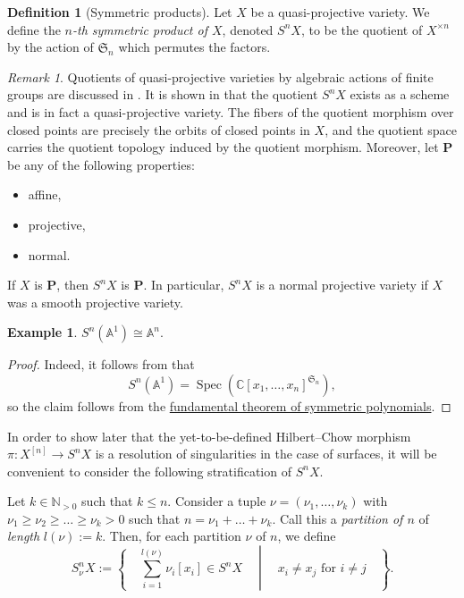 \documentclass[12pt,a4paper]{amsart}
\theoremstyle{plain}
\theoremstyle{definition}
\newtheorem{defn}[thm]{Definition}
\newtheorem{exmp}[thm]{Example}
\theoremstyle{remark}
\newtheorem{rem}[thm]{Remark}
\begin{document}
\begin{defn}[Symmetric products]
  Let $X$ be a quasi-projective variety.
  We define the \textit{$n$-th symmetric product of $X$}, denoted $S^{n}X$, to be the quotient of $X^{\times n}$ by the action of $\mathfrak{S}_{n}$ which permutes the factors.
\end{defn}

\begin{rem}
  Quotients of quasi-projective varieties by algebraic actions of finite groups are discussed in .
  It is shown in  that the quotient $S^{n}X$ exists as a scheme and is in fact a quasi-projective variety.
  The fibers of the quotient morphism over closed points are precisely the orbits of closed points in $X$, and the quotient space carries the quotient topology induced by the quotient morphism.
  Moreover, let $\mathbf{P}$ be any of the following properties:
  \begin{itemize}
    \item affine,
    \item projective,
    \item normal.
  \end{itemize}
  If $X$ is $\mathbf{P}$, then $S^{n}X$ is $\mathbf{P}$.
  In particular, $S^{n}X$ is a normal projective variety if $X$ was a smooth projective variety.
\end{rem}

\begin{exmp}\label{exmp:affineline}
  $S^{n}(\mathbb{A}^{1}) \cong \mathbb{A}^{n}$.
  
  \begin{proof}
    Indeed, it follows from  that
    \[ S^{n}(\mathbb{A}^{1}) = \operatorname{Spec}\left(\mathbb{C}[x_{1}, \ldots, x_{n}]^{\mathfrak{S}_{n}}\right), \]
    so the claim follows from the \href{https://en.wikipedia.org/wiki/Elementary_symmetric_polynomial#Fundamental_theorem_of_symmetric_polynomials}{fundamental theorem of symmetric polynomials}.
  \end{proof}
\end{exmp}

In order to show later that the yet-to-be-defined Hilbert--Chow morphism $\pi \colon X^{[n]} \to S^{n}X$ is a resolution of singularities in the case of surfaces, it will be convenient to consider the following stratification of $S^{n}X$.

Let $k \in \mathbb{N}_{>0}$ such that $k \leq n$.
Consider a tuple $\nu = (\nu_{1}, \ldots, \nu_{k})$ with $\nu_{1} \geq \nu_{2} \geq \ldots \geq \nu_{k} > 0$ such that $n = \nu_{1} + \ldots + \nu_{k}$.
Call this a \textit{partition of $n$} of \textit{length} $l(\nu) := k$.
Then, for each partition $\nu$ of $n$, we define
\[ S^{n}_{\nu}X := \left\{ \quad \sum_{i = 1}^{l(\nu)} \nu_{i}[x_{i}] \in S^{n}X \quad \middle| \quad x_{i} \neq x_{j} \text{ for } i \neq j \quad \right\}. \]
\end{document}
